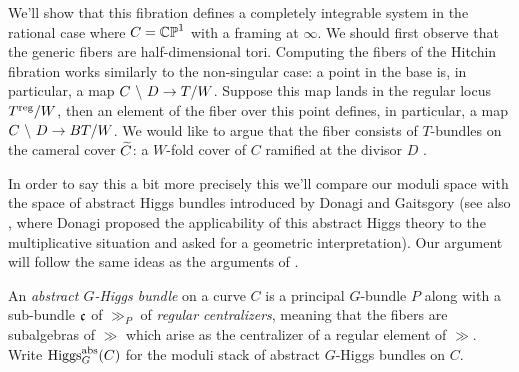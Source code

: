 \documentclass[10pt, oneside]{article}
\begin{document}
\begin{remark}
\end{remark}

We'll show that this fibration defines a completely integrable system in the rational case where $C = \mathbb{CP}^1$ with a framing at $\infty$.  We should first observe that the generic fibers are half-dimensional tori.  Computing the fibers of the Hitchin fibration works similarly to the non-singular case: a point in the base is, in particular, a map $C \ \backslash \  D \to T/W$.  Suppose this map lands in the regular locus $T^{\mathrm{reg}}/W$, then an element of the fiber over this point defines, in particular, a map $C \ \backslash \  D \to BT/W$.  We would like to argue that the fiber consists of $T$-bundles on the cameral cover $\widetilde{C}$: a $W$-fold cover of $C$ ramified at the divisor $D$ .

In order to say this a bit more precisely this we'll compare our moduli space with the space of abstract Higgs bundles introduced by Donagi and Gaitsgory \cite{DonagiGaitsgory} (see also \cite{DonagiLectures}, where Donagi proposed the applicability of this abstract Higgs theory to the multiplicative situation and asked for a geometric interpretation).  Our argument will follow the same ideas as the arguments of \cite[Section 6]{HurtubiseMarkman}.

\begin{definition}
An \emph{abstract $G$-Higgs bundle} on a curve $C$ is a principal $G$-bundle $P$ along with a sub-bundle $\mathfrak{c}$ of $\gg_P$ of \emph{regular centralizers}, meaning that the fibers are subalgebras of $\gg$ which arise as the centralizer of a regular element of $\gg$.  Write $\operatorname{Higgs}_G^{\mathrm{abs}}(C)$ for the moduli stack of abstract $G$-Higgs bundles on $C$.
\end{definition}
\end{document}
